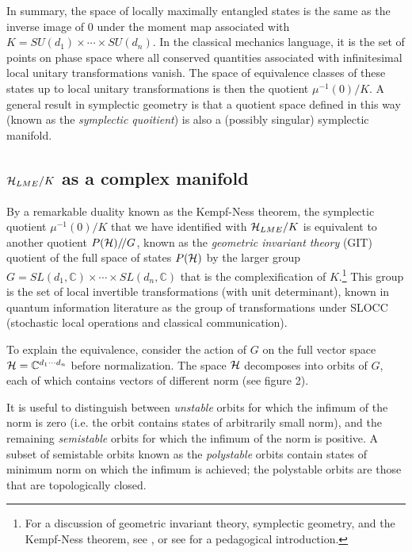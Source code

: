\documentclass[12pt]{article}
\theoremstyle{definition}
\newcommand{\GITquot}{/\!/}
\begin{document}
In summary, the space of locally maximally entangled states is the same as the inverse image of $0$ under the moment map associated with $K = SU(d_1) \times \cdots \times SU(d_n)$. In the classical mechanics language, it is the set of points on phase space where all conserved quantities associated with infinitesimal local unitary transformations vanish. The space of equivalence classes of these states up to local unitary transformations is then the quotient $\mu^{-1}(0)/K$. A general result in symplectic geometry is that a quotient space defined in this way (known as the {\it symplectic quoitient}) is also a (possibly singular) symplectic manifold.

\subsection{${\cal H}_{LME}/K$ as a complex manifold}

By a remarkable duality known as the Kempf-Ness theorem, the
symplectic quotient $\mu^{-1}(0)/K$ that we have identified with
${\cal H}_{LME}/K$ is equivalent to another quotient $P({\cal H})\GITquot G$,
known as the {\it geometric invariant theory} (GIT)
quotient of the full space of states $P({\cal H})$ by the larger group
$G = SL(d_1, \mathbb{C}) \times \cdots \times SL(d_n, \mathbb{C})$
that is the complexification of $K$.\footnote{For a discussion of geometric
invariant theory, symplectic geometry, and the Kempf-Ness theorem, see
\cite{mfk}, or see \cite{Hoskins} for a pedagogical introduction.} This group is the set of local
invertible transformations (with unit determinant), known in quantum
information literature as the group of transformations under SLOCC
(stochastic local operations and classical communication).

To explain the equivalence, consider the action of $G$ on the full vector space ${\cal H} = \mathbb{C}^{d_1 \cdots d_n}$ before normalization. The space ${\cal H}$ decomposes into orbits of $G$, each of which contains vectors of different norm (see figure 2).

It is useful to distinguish between {\it unstable} orbits for which the infimum of the norm is zero (i.e. the orbit contains states of arbitrarily small norm), and the remaining {\it semistable} orbits for which the infimum of the norm is positive. A subset of semistable orbits known as the {\it polystable} orbits contain states of minimum norm on which the infimum is achieved; the polystable orbits are those that are topologically closed.
\end{document}
